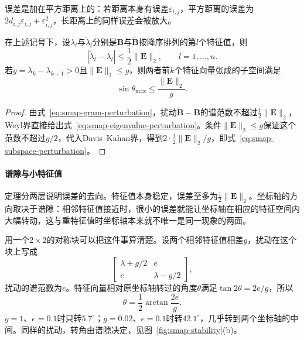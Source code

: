 误差是加在平方距离上的：若距离本身有误差$\varepsilon_{i,j}$，平方距离的误差为$2d_{i,j}\varepsilon_{i,j}+\varepsilon_{i,j}^2$，长距离上的同样误差会被放大。

\begin{theorem}[完整距离表的谱扰动]
\label{thm:smap-mds-perturbation}
在上述记号下，设$\lambda_l$与$\widetilde\lambda_l$分别是$\bm B$与$\widetilde{\bm B}$按降序排列的第$l$个特征值，则
\begin{equation}
 |\widetilde\lambda_l-\lambda_l|\leq\frac12\lVert\bm E\rVert_2,\qquad l=1,\ldots,n .
 \label{eq:smap-eigenvalue-perturbation}
\end{equation}
若$g=\lambda_k-\lambda_{k+1}>0$且$\lVert\bm E\rVert_2\leq g$，则两者前$k$个特征向量张成的子空间满足
\begin{equation}
 \sin\theta_{\max}\leq\frac{\lVert\bm E\rVert_2}g .
 \label{eq:smap-subspace-perturbation}
\end{equation}
\end{theorem}
\begin{proof}
由式~\eqref{eq:smap-gram-perturbation}，扰动$\widetilde{\bm B}-\bm B$的谱范数不超过$\frac12\lVert\bm E\rVert_2$，Weyl界直接给出式~\eqref{eq:smap-eigenvalue-perturbation}。条件$\lVert\bm E\rVert_2\leq g$保证这个范数不超过$g/2$，代入Davis--Kahan界，得到$2\cdot\frac12\lVert\bm E\rVert_2/g$，即式~\eqref{eq:smap-subspace-perturbation}。
\end{proof}

\paragraph{谱隙与小特征值}

定理分两层说明误差的去向。特征值本身稳定，误差至多为$\frac12\lVert\bm E\rVert_2$。坐标轴的方向取决于谱隙：相邻特征值接近时，很小的误差就能让坐标轴在相应的特征空间内大幅转动，这与重特征值时坐标轴本来就不唯一是同一现象的两面。

用一个$2\times2$的对称块可以把这件事算清楚。设两个相邻特征值相差$g$，扰动在这个块上写成
\[
 \begin{bmatrix}\lambda+g/2&e\\e&\lambda-g/2\end{bmatrix},
\]
扰动的谱范数为$e$。特征向量相对原坐标轴转过的角度$\theta$满足$\tan2\theta=2e/g$，所以
\begin{equation}
 \theta=\frac12\arctan\frac{2e}g .
 \label{eq:smap-gap-rotation}
\end{equation}
$g=1$、$e=0.1$时只转$5.7^\circ$；$g=0.02$、$e=0.1$时转$42.1^\circ$，几乎转到两个坐标轴的中间。同样的扰动，转角由谱隙决定，见图~\ref{fig:smap-stability}(b)。

